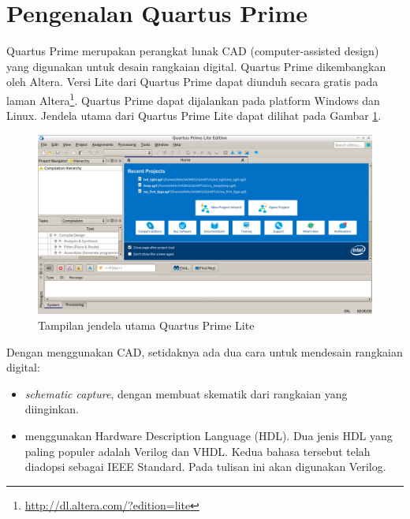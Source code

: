 
\section{Pengenalan Quartus Prime}

Quartus Prime merupakan perangkat lunak CAD (computer-assisted design)
yang digunakan untuk desain rangkaian digital. Quartus Prime dikembangkan
oleh Altera. Versi Lite dari Quartus Prime dapat diunduh secara gratis
pada laman Altera\footnote{\url{http://dl.altera.com/?edition=lite}}.
Quartus Prime dapat dijalankan pada
platform Windows dan Linux.
Jendela utama dari Quartus Prime Lite dapat dilihat pada Gambar
\ref{fig:main_window}.

\begin{figure}
\centering
\includegraphics[width=\textwidth]{images/FirstOpen.png}
\par
\caption{Tampilan jendela utama Quartus Prime Lite}\label{fig:main_window}
\end{figure}

Dengan menggunakan CAD, setidaknya ada dua cara untuk
mendesain rangkaian digital:
\begin{itemize}
\item \textit{schematic capture}, dengan membuat skematik dari rangkaian yang
diinginkan.
\item menggunakan Hardware Description Language (HDL).
Dua jenis HDL yang paling populer adalah Verilog dan VHDL.
Kedua bahasa tersebut telah diadopsi sebagai IEEE Standard.
Pada tulisan ini akan digunakan Verilog.
\end{itemize}
